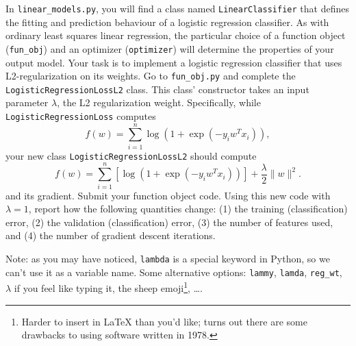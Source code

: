 \documentclass{article}
\newcommand{\blu}[1]{{\textcolor{blu}{#1}}}
\let\ask\blu
\newcommand{\norm}[1]{\lVert #1 \rVert}
\begin{document}
In \verb|linear_models.py|, you will find a class named \verb|LinearClassifier| that defines the fitting and prediction behaviour of a logistic regression classifier. As with ordinary least squares linear regression, the particular choice of a function object (\verb|fun_obj|) and an optimizer (\verb|optimizer|) will determine the properties of your output model.
Your task is to implement a logistic regression classifier that uses L2-regularization on its weights. Go to \verb|fun_obj.py| and complete the \verb|LogisticRegressionLossL2| class. This class' constructor takes an input parameter $\lambda$, the L2 regularization weight. Specifically, while \verb|LogisticRegressionLoss| computes
\[
f(w) = \sum_{i=1}^n \log(1+\exp(-y_iw^Tx_i)),
\]
your new class \verb|LogisticRegressionLossL2| should compute
\[
f(w) = \sum_{i=1}^n \left[\log(1+\exp(-y_iw^Tx_i))\right] + \frac{\lambda}{2}\norm{w}^2.
\]
and its gradient.
\ask{Submit your function object code. Using this new code with $\lambda = 1$, report how the following quantities change: (1) the training (classification) error, (2) the validation (classification) error, (3) the number of features used, and (4) the number of gradient descent iterations.}

Note: as you may have noticed, \verb|lambda| is a special keyword in Python, so we can't use it as a variable name.
Some alternative options:
\verb|lammy|,
\verb|lamda|,
\verb|reg_wt|,
$\lambda$ if you feel like typing it,
the sheep emoji\footnote{Harder to insert in \LaTeX{} than you'd like; turns out there are some drawbacks to using software written in 1978.},
\dots.
\end{document}
